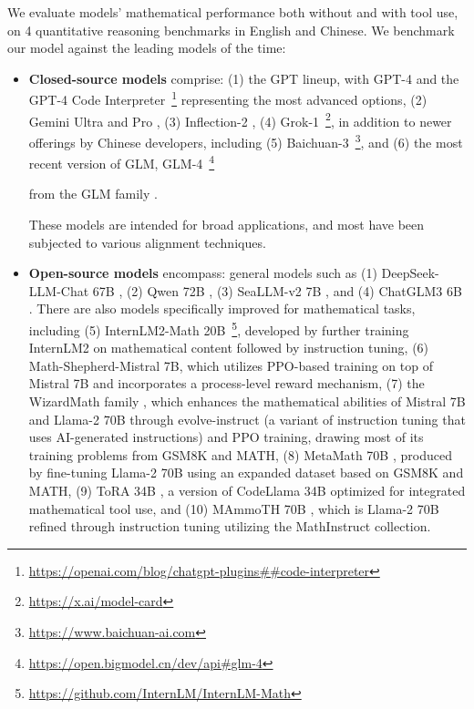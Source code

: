 \begin{itemize}[topsep=0pt]
We evaluate models' mathematical performance both without and with tool use, on 4 quantitative reasoning benchmarks in English and Chinese. We benchmark our model against the leading models of the time:

\begin{itemize}[topsep=0pt]
    \item \textbf{Closed-source models} comprise: (1) the GPT lineup, with GPT-4 \citep{gpt4} and the GPT-4 Code Interpreter~\footnote{\url{https://openai.com/blog/chatgpt-plugins\#\#code-interpreter}} representing the most advanced options, (2) Gemini Ultra and Pro \citep{gemini}, (3) Inflection-2 \citep{inflection-2}, (4) Grok-1~\footnote{\url{https://x.ai/model-card}},
    in addition to newer offerings by Chinese developers, including (5) Baichuan-3~\footnote{\url{https://www.baichuan-ai.com}},
    and (6) the most recent version of GLM, GLM-4~\footnote{\url{https://open.bigmodel.cn/dev/api\#glm-4}}

    from the GLM family \citep{glm}.

These models are intended for broad applications, and most have been subjected to various alignment techniques.  
\item \textbf{Open-source models} encompass: general models such as (1) DeepSeek-LLM-Chat 67B \citep{deepseek-llm}, (2) Qwen 72B \citep{qwen}, (3) SeaLLM-v2 7B \citep{seallm}, and (4) ChatGLM3 6B \citep{chatglm3}. There are also models specifically improved for mathematical tasks, including (5) InternLM2-Math 20B~\footnote{\url{https://github.com/InternLM/InternLM-Math}}, developed by further training InternLM2 on mathematical content followed by instruction tuning, (6) Math-Shepherd-Mistral 7B, which utilizes PPO-based training \citep{schulman2017proximal} on top of Mistral 7B \citep{mistral} and incorporates a process-level reward mechanism, (7) the WizardMath family \citep{wizardmath}, which enhances the mathematical abilities of Mistral 7B and Llama-2 70B \citep{llama2} through evolve-instruct (a variant of instruction tuning that uses AI-generated instructions) and PPO training, drawing most of its training problems from GSM8K and MATH, (8) MetaMath 70B \citep{metamath}, produced by fine-tuning Llama-2 70B using an expanded dataset based on GSM8K and MATH, (9) ToRA 34B \cite{tora}, a version of CodeLlama 34B optimized for integrated mathematical tool use, and (10) MAmmoTH 70B \citep{MathInstruct}, which is Llama-2 70B refined through instruction tuning utilizing the MathInstruct collection.


\end{itemize}
\end{itemize}

